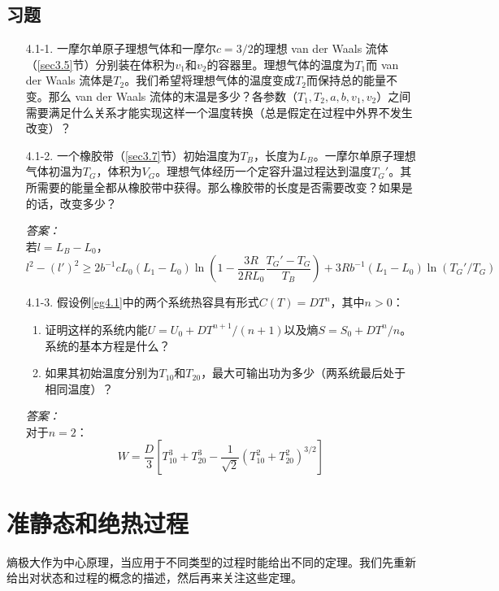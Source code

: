 \subsection*{习题}
\begin{itemize}
\item[4.1-1.] 一摩尔单原子理想气体和一摩尔$c=3/2$的理想 van der Waals 流体（\ref{sec3.5}节）分别装在体积为$v_1$和$v_2$的容器里。理想气体的温度为$T_1$而 van der Waals 流体是$T_2$。我们希望将理想气体的温度变成$T_2$而保持总的能量不变。那么 van der Waals 流体的末温是多少？各参数（$T_1,T_2,a,b,v_1,v_2$）之间需要满足什么关系才能实现这样一个温度转换（总是假定在过程中外界不发生改变）？
\item[4.1-2.] 一个橡胶带（\ref{sec3.7}节）初始温度为$T_B$，长度为$L_{B}$。一摩尔单原子理想气体初温为$T_G$，体积为$V_G$。理想气体经历一个定容升温过程达到温度$T_G'$。其所需要的能量全都从橡胶带中获得。那么橡胶带的长度是否需要改变？如果是的话，改变多少？
\begin{flushright}
{\it 答案：}\\
若$l=L_B-L_0$，
\[
l^2-(l')^2\ge 2b^{-1}cL_0(L_1-L_0)\ln\left(1-\frac{3R}{2RL_0}\frac{T_G'-T_G}{T_B}\right)+3Rb^{-1}(L_1-L_0)\ln(T_G'/T_G)
\]
\end{flushright}
\item[4.1-3.] 假设例\ref{eg4.1}中的两个系统热容具有形式$C(T)=DT^n$，其中$n>0$：\\
\begin{enumerate}
\item 证明这样的系统内能$U=U_0+DT^{n+1}/(n+1)$以及熵$S=S_0+DT^n/n$。系统的基本方程是什么？
\item 如果其初始温度分别为$T_{10}$和$T_{20}$，最大可输出功为多少（两系统最后处于相同温度）？
\end{enumerate}
\begin{flushright}
{\it 答案：}\\
对于$n=2$：
\[
W=\frac{D}{3}\left[T_{10}^3+T_{20}^3-\frac{1}{\sqrt{2}}(T_{10}^2+T_{20}^2)^{3/2}\right]
\]
\end{flushright}
\end{itemize}

\section{准静态和绝热过程}\label{sec4.2}
熵极大作为中心原理，当应用于不同类型的过程时能给出不同的定理。我们先重新给出对状态和过程的概念的描述，然后再来关注这些定理。

